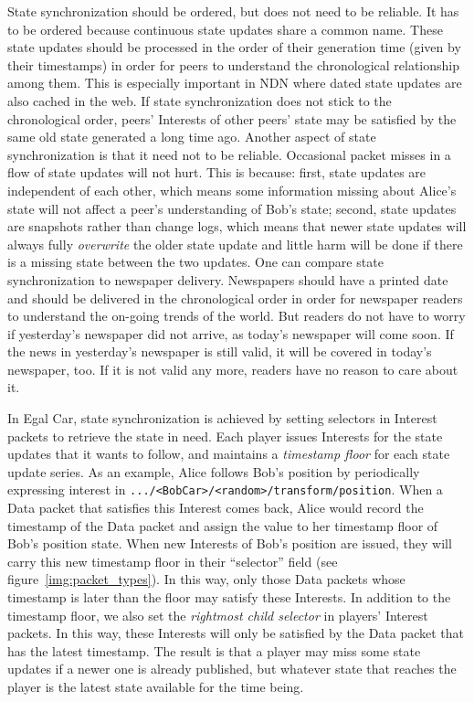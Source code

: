 \documentclass{article}
\begin{document}
State synchronization should be ordered, but does not need to be reliable. It has to be ordered because continuous state updates share a common name. These state updates should be processed in the order of their generation time (given by their timestamps) in order for peers to understand the chronological relationship among them. This is especially important in NDN where dated state updates are also cached in the web. If state synchronization does not stick to the chronological order, peers' Interests of other peers' state may be satisfied by the same old state generated a long time ago. Another aspect of state synchronization is that it need not to be reliable. Occasional packet misses in a flow of state updates will not hurt. This is because: first, state updates are independent of each other, which means some information missing about Alice's state will not affect a peer's understanding of Bob's state; second, state updates are snapshots rather than change logs, which means that newer state updates will always fully \emph{overwrite} the older state update and little harm will be done if there is a missing state between the two updates. One can compare state synchronization to newspaper delivery. Newspapers should have a printed date and should be delivered in the chronological order in order for newspaper readers to understand the on-going trends of the world. But readers do not have to worry if yesterday's newspaper did not arrive, as today's newspaper will come soon. If the news in yesterday's newspaper is still valid, it will be covered in today's newspaper, too. If it is not valid any more, readers have no reason to care about it.

In Egal Car, state synchronization is achieved by setting selectors in Interest packets to retrieve the state in need. Each player issues Interests for the state updates that it wants to follow, and maintains a \emph{timestamp floor} for each state update series. As an example, Alice follows Bob's position by periodically expressing interest in \texttt{.../<BobCar>/<random>/transform/position}. When a Data packet that satisfies this Interest comes back, Alice would record the timestamp of the Data packet and assign the value to her timestamp floor of Bob's position state. When new Interests of Bob's position are issued, they will carry this new timestamp floor in their ``selector'' field (see figure~\ref{img:packet_types}). In this way, only those Data packets whose timestamp is later than the floor may satisfy these Interests. In addition to the timestamp floor, we also set the \emph{rightmost child selector} in players' Interest packets. In this way, these Interests will only be satisfied by the Data packet that has the latest timestamp. The result is that a player may miss some state updates if a newer one is already published, but whatever state that reaches the player is the latest state available for the time being.
\end{document}
